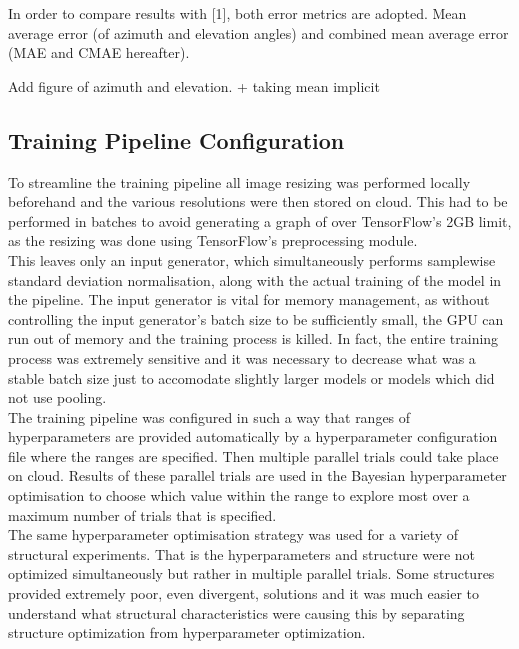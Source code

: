 \documentclass{article}
\begin{document}
In order to compare results with [1], both error metrics are adopted. Mean average error (of azimuth and elevation angles) and combined mean average error (MAE and CMAE hereafter).

Add figure of azimuth and elevation. + taking mean implicit

\subsection{Training Pipeline Configuration}
To streamline the training pipeline all image resizing was performed locally beforehand and the various resolutions were then stored on cloud. This had to be performed in batches to avoid generating a graph of over TensorFlow's 2GB limit, as the resizing was done using TensorFlow's preprocessing module. \\

This leaves only an input generator, which simultaneously performs samplewise standard deviation normalisation, along with the actual training of the model in the pipeline.
The input generator is vital for memory management, as without controlling the input generator's batch size to be sufficiently small, the GPU can run out of memory and the training process is killed. In fact, the entire training process was extremely sensitive and it was necessary to decrease what was a stable batch size just to accomodate slightly larger models or models which did not use pooling. \\

The training pipeline was configured in such a way that ranges of hyperparameters are provided automatically by a hyperparameter configuration file where the ranges are specified. Then multiple parallel trials could take place on cloud. Results of these parallel trials are used in the Bayesian hyperparameter optimisation to choose which value within the range to explore most over a maximum number of trials that is specified. \\

The same hyperparameter optimisation strategy was used for a variety of structural experiments. That is the hyperparameters and structure were not optimized simultaneously but rather in multiple parallel trials. Some structures provided extremely poor, even divergent, solutions and it was much easier to understand what structural characteristics were causing this by separating structure optimization from hyperparameter optimization.\\
\end{document}
